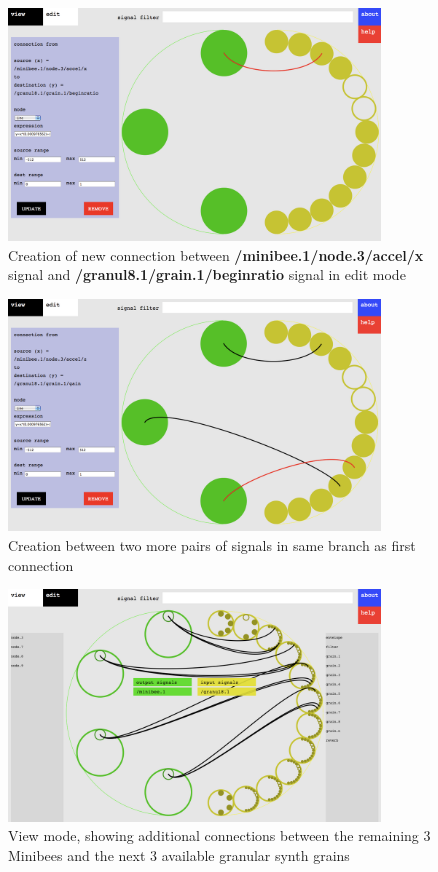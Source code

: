 \begin{figure}[htb]
\centering
\includegraphics[width=0.88\textwidth]{vizmapperSeven.png}
\caption{Creation of new connection between \textbf{/minibee.1/node.3/accel/x} signal and \textbf{/granul8.1/grain.1/beginratio} signal in edit mode}
\label{fig:vizSeven}
\end{figure}

\begin{figure}[hp]
\centering
\includegraphics[width=0.88\textwidth]{vizmapperEight.png}
\caption{Creation between two more pairs of signals in same branch as first connection}
\label{fig:vizEight}
\end{figure}

\begin{figure}[hp]
\centering
\includegraphics[width=0.88\textwidth]{vizmapperNine.png}
\caption{View mode, showing additional connections between the remaining 3 Minibees and the next 3 available granular synth grains}
\label{fig:vizNine}
\end{figure}

